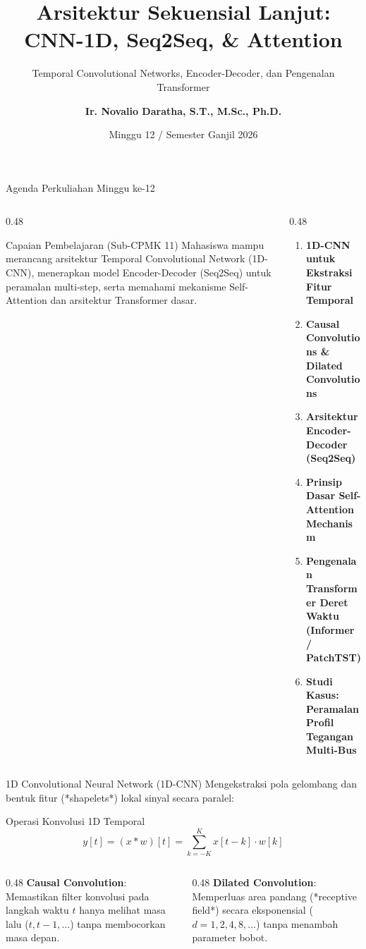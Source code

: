 \documentclass[aspectratio=169, 10pt]{beamer}
\title[\textbf{Deret Waktu (Minggu 12)}]{\textbf{Arsitektur Sekuensial Lanjut: CNN-1D, Seq2Seq, \& Attention}}
\subtitle{Temporal Convolutional Networks, Encoder-Decoder, dan Pengenalan Transformer}
\author[\textbf{Ir. Novalio Daratha, Ph.D.}]{\textbf{Ir. Novalio Daratha, S.T., M.Sc., Ph.D.}}
\institute[FT UNIB]{Program Studi Teknik Elektro -- Fakultas Teknik\\Universitas Bengkulu}
\date{Minggu 12 / Semester Ganjil 2026}
\begin{document}
\begin{frame}[plain]
    \titlepage
\end{frame}

\begin{frame}{Agenda Perkuliahan Minggu ke-12}
    \begin{columns}[T]
        \begin{column}{0.48\textwidth}
            \begin{block}{Capaian Pembelajaran (Sub-CPMK 11)}
                Mahasiswa mampu merancang arsitektur Temporal Convolutional Network (1D-CNN), menerapkan model Encoder-Decoder (Seq2Seq) untuk peramalan multi-step, serta memahami mekanisme Self-Attention dan arsitektur Transformer dasar.
            \end{block}
        \end{column}
        \begin{column}{0.48\textwidth}
            \begin{enumerate}
                \item \textbf{1D-CNN untuk Ekstraksi Fitur Temporal}
                \item \textbf{Causal Convolutions \& Dilated Convolutions}
                \item \textbf{Arsitektur Encoder-Decoder (Seq2Seq)}
                \item \textbf{Prinsip Dasar Self-Attention Mechanism}
                \item \textbf{Pengenalan Transformer Deret Waktu (Informer / PatchTST)}
                \item \textbf{Studi Kasus: Peramalan Profil Tegangan Multi-Bus}
            \end{enumerate}
        \end{column}
    \end{columns}
\end{frame}

\begin{frame}{1D Convolutional Neural Network (1D-CNN)}
    Mengekstraksi pola gelombang dan bentuk fitur (*shapelets*) lokal sinyal secara paralel:
    \begin{block}{Operasi Konvolusi 1D Temporal}
        \begin{equation}
            y[t] = (x * w)[t] = \sum_{k=-K}^K x[t - k] \cdot w[k]
        \end{equation}
    \end{block}
    \begin{columns}[T]
        \begin{column}{0.48\textwidth}
            \textbf{Causal Convolution}: Memastikan filter konvolusi pada langkah waktu $t$ hanya melihat masa lalu ($t, t-1, \dots$) tanpa membocorkan masa depan.
        \end{column}
        \begin{column}{0.48\textwidth}
            \textbf{Dilated Convolution}: Memperluas area pandang (*receptive field*) secara eksponensial ($d = 1, 2, 4, 8, \dots$) tanpa menambah parameter bobot.
        \end{column}
    \end{columns}
\end{frame}
\end{document}
